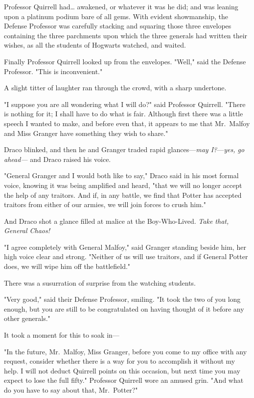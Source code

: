 Professor Quirrell had{\ldots} awakened, or whatever it was he did; and was
leaning upon a platinum podium bare of all gems. With evident showmanship, the
Defense Professor was carefully stacking and squaring those three envelopes
containing the three parchments upon which the three generals had written their
wishes, as all the students of Hogwarts watched, and waited.

Finally Professor Quirrell looked up from the envelopes. "Well," said the
Defense Professor. "This is inconvenient."

A slight titter of laughter ran through the crowd, with a sharp undertone.

"I suppose you are all wondering what I will do?" said Professor Quirrell.
"There is nothing for it; I shall have to do what is fair. Although first there
was a little speech I wanted to make, and before even that, it appears to me
that Mr.~Malfoy and Miss Granger have something they wish to share."

Draco blinked, and then he and Granger traded rapid glances---\emph{may
I?}---\emph{yes, go ahead---} and Draco raised his voice.

"General Granger and I would both like to say," Draco said in his most formal
voice, knowing it was being amplified and heard, "that we will no longer accept
the help of any traitors. And if, in any battle, we find that Potter has
accepted traitors from either of our armies, we will join forces to crush him."

And Draco shot a glance filled at malice at the Boy-Who-Lived. \emph{Take that,
General Chaos!}

"I agree completely with General Malfoy," said Granger standing beside him, her
high voice clear and strong. "Neither of us will use traitors, and if General
Potter does, we will wipe him off the battlefield."

There was a susurration of surprise from the watching students.

"Very good," said their Defense Professor, smiling. "It took the two of you
long enough, but you are still to be congratulated on having thought of it
before any other generals."

It took a moment for this to soak in---

"In the future, Mr.~Malfoy, Miss Granger, before you come to my office with any
request, consider whether there is a way for you to accomplish it without my
help. I will not deduct Quirrell points on this occasion, but next time you may
expect to lose the full fifty." Professor Quirrell wore an amused grin. "And
what do you have to say about that, Mr.~Potter?"

